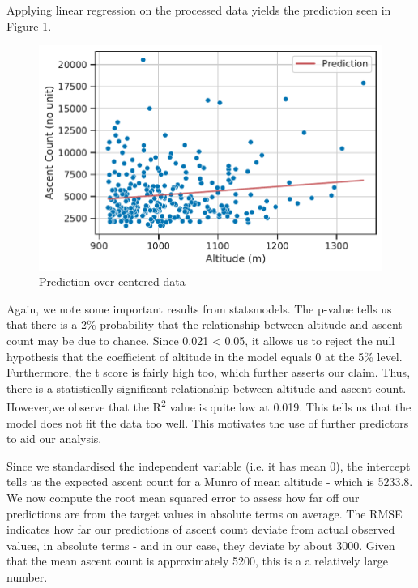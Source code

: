 \documentclass[11pt,a4paper]{article}
\begin{document}
\medskip 

Applying linear regression on the processed data yields the prediction seen in Figure \ref{fds-project-template:fig:q1_prediction}. 

\begin{figure} [h!]
  \centering
  \includegraphics{report/q1_prediction.pdf}
  \caption{Prediction over centered data}
  \label{fds-project-template:fig:q1_prediction}
\end{figure}

\medskip

Again, we note some important results from statsmodels. The p-value tells us that there is a 2\% probability that the relationship between altitude and ascent count may be due to chance. Since 0.021 < 0.05, it allows us to reject the null hypothesis that the coefficient of altitude in the model equals 0 at the 5\% level. Furthermore, the t score is fairly high too, which further asserts our claim. Thus, there is a statistically significant relationship between altitude and ascent count. However,we observe that the R\textsuperscript{2} value is quite low at 0.019. This tells us that the model does not fit the data too well. This motivates the use of further predictors to aid our analysis.

\medskip 

Since we standardised the independent variable (i.e. it has mean 0), the intercept tells us the expected ascent count for a Munro of mean altitude - which is 5233.8. We now compute the root mean squared error to assess how far off our predictions are from the target values in absolute terms on average. The RMSE indicates how far our predictions of ascent count deviate from actual observed values, in absolute terms - and in our case, they deviate by about 3000. Given that the mean ascent count is approximately 5200, this is a a relatively large number.
\end{document}
